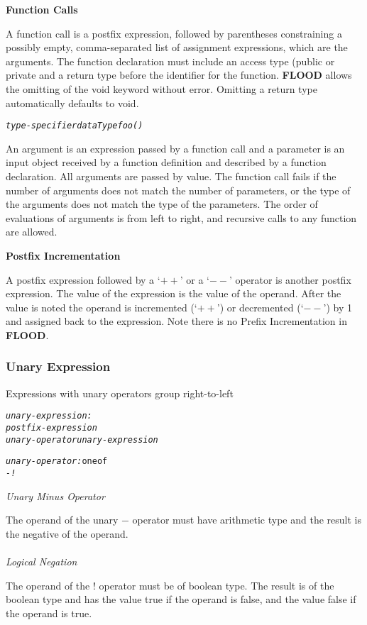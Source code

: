 \documentclass[12pt]{report}
\begin{document}
\begin{doublespace}
\begin{flushleft}
\textbf{Function Calls}
\end{flushleft}

A function call is a postfix expression, followed by parentheses constraining a possibly empty, comma-separated list of assignment expressions, which are the arguments. The function declaration must include an access type (public or private and a return type before the identifier for the function. \textbf{FLOOD} allows the omitting of the void keyword without error. Omitting a return type automatically defaults to void.
\begin{alltt}
         \textit{type-specifier dataType foo()}
\end{alltt}

An argument is an expression passed by a function call and a parameter is an input object received by a function definition and described by a function declaration. All arguments are passed by value. The function call fails if the number of arguments does not match the number of parameters, or the type of the arguments does not match the type of the parameters. The order of evaluations of arguments is from left to right, and recursive calls to any function are allowed.
\begin{flushleft}
\textbf{Postfix Incrementation}
\end{flushleft}

A postfix expression followed by a `$++$' or a `$--$' operator is another postfix expression. The value of the expression is the value of the operand. After the value is noted the operand is incremented (`$++$') or decremented (`$--$') by 1 and assigned back to the expression. Note there is no Prefix Incrementation in \textbf{FLOOD}.
\end{doublespace}

\subsubsection{Unary Expression}

Expressions with unary operators group right-to-left
\begin{alltt}
         \textit{unary-expression:}
              \textit{postfix-expression}
              \textit{unary-operator unary-expression}
              
         \textit{unary-operator:} one of
              \textit{-}   \textit{!}
\end{alltt}
\begin{doublespace}
\textit{Unary Minus Operator}

The operand of the unary $-$ operator must have arithmetic type and the result is the negative of the operand.\\
\\
\textit{Logical Negation}

The operand of the $!$ operator must be of boolean type. The result is of the boolean type and has the value true if the operand is false, and the value false if the operand is true.
\end{doublespace}
\end{document}
